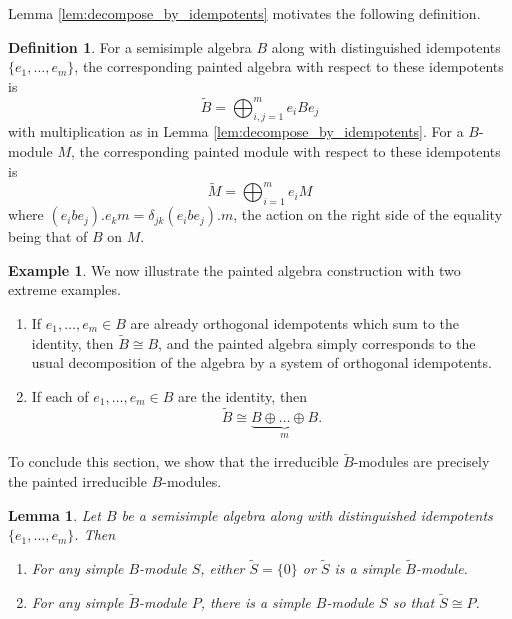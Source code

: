 \documentclass[10pt]{amsart}
\theoremstyle{definition}
\newtheorem{defi}[defi]{Definition}
\theoremstyle{definition}
\newtheorem{exam}[exam]{Example}
\theoremstyle{plain}
\newtheorem{lemma}[lemma]{Lemma}
\theoremstyle{remark}
\theoremstyle{plain}
\theoremstyle{plain}
\newcommand{\tB}{{\tilde{B}}}
\newcommand{\tS}{{\tilde{S}}}
\begin{document}
Lemma \ref{lem:decompose_by_idempotents} motivates the following definition.

\begin{defi}
For a semisimple algebra $B$ along with distinguished idempotents $\{e_1,\dots,e_m\}$, the corresponding painted algebra with respect to these idempotents is \[\tB=\bigoplus_{i,j=1}^m e_i B e_j\] with multiplication as in Lemma \ref{lem:decompose_by_idempotents}. For a $B$-module $M$, the corresponding painted module with respect to these idempotents is \[\tilde{M}=\bigoplus_{i=1}^m e_i M\]  where $(e_i b e_j).e_k m=\delta_{jk}(e_ibe_j).m$, the action on the right side of the equality being that of $B$ on $M$.
\end{defi}

\begin{exam} We now illustrate the painted algebra construction with two extreme examples.
    
    \begin{enumerate}[label={\alph*}]
        \item[(a)] If $e_1,\dots,e_m\in B$ are already orthogonal idempotents which sum to the identity, then $\tilde{B}\cong B$, and the painted algebra simply corresponds to the usual decomposition of the algebra by a system of orthogonal idempotents.
        \item[(b)] If each of $e_1,\dots,e_m\in B$ are the identity, then \[\tilde{B}\cong\underbrace{B\oplus\dots\oplus B}_{m}.\]
    \end{enumerate}

\end{exam}

To conclude this section, we show that the irreducible $\tB$-modules are precisely the painted irreducible $B$-modules.

\begin{lemma}\label{lem:symmetrized_modules}
    Let $B$ be a semisimple algebra along with distinguished idempotents $\{e_1,\dots,e_m\}$. Then \begin{enumerate}
        \item For any simple $B$-module $S$, either $\tS=\{0\}$ or $\tS$ is a simple $\tB$-module.
        \item For any simple $\tB$-module $P$, there is a simple $B$-module $S$ so that $\tS\cong P$.
    \end{enumerate}
\end{lemma}
\end{document}
